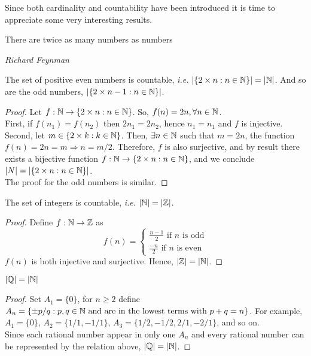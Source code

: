 Since both cardinality and countability have been introduced it is time to appreciate some very interesting results.

\epigraph{There are twice as many numbers as numbers}{\textit{Richard Feynman}}

\begin{theorem}
    The set of positive even numbers is countable, \emph{i.e.} $|\{ 2\times n: n \in \mathbb{N}\}| = |\mathbb{N}|$. And so are the odd numbers, $|\{ 2\times n - 1: n \in \mathbb{N}\}|$.
\end{theorem}

\begin{proof}
    Let $f: \mathbb{N} \to \{2 \times n: n \in \mathbb{N} \}$. So, $f(n) = 2n, \forall n \in \mathbb{N}$. \\
    First, if $f(n_1) = f(n_2)$ then $2n_1 = 2n_2$, hence $n_1 = n_1$ and $f$ is injective. \\
    Second, let $m \in \{ 2\times k: k \in \mathbb{N}\}$. Then, $\exists n \in \mathbb{N}$ such that $m = 2n$, the function $f(n) = 2n = m \Rightarrow n = m/2$. Therefore, $f$ is also surjective, and by result there exists a bijective function $f: \mathbb{N} \to \{2 \times n: n \in \mathbb{N} \}$, and we conclude $|N| = |\{ 2\times n: n \in \mathbb{N}\}|$. \\
    The proof for the odd numbers is similar.
\end{proof}

\begin{theorem}[Countability of $\Z$]
    The set of integers is countable, \emph{i.e.} $|\mathbb{N}| = |\mathbb{Z}|$.
\end{theorem}

\begin{proof}
    Define $f: \mathbb{N} \to \mathbb{Z}$ as
    \begin{equation*}
        f(n) = \begin{cases}
            \frac{n-1}{2} \text{ if } n \text{ is odd} \\
            \frac{-n}{2} \text{ if } n \text{ is even}
        \end{cases}
    \end{equation*}
    $f(n)$ is both injective and surjective. Hence, $|\mathbb{Z}| = |\mathbb{N}|$.
\end{proof}

\begin{theorem}[Countability of $\Q$]
    $|\mathbb{Q}| = |\mathbb{N}|$
\end{theorem}

\begin{proof}
    Set $A_1 = \{0 \}$, for $n \geq 2$ define $A_n = \{ \pm p/q: p,q \in \mathbb{N} \text{ and are in the lowest terms with } p + q = n\}$. For example, $A_1 = \{0\}$, $A_2 =\{ 1/1, -1/1\}$, $A_3 = \{ 1/2, -1/2, 2/1, -2/1\}$, and so on.\\
    Since each rational number appear in only one $A_n$ and every rational number can be represented by the relation above, $|\mathbb{Q}| = |\mathbb{N}|$.
\end{proof}

